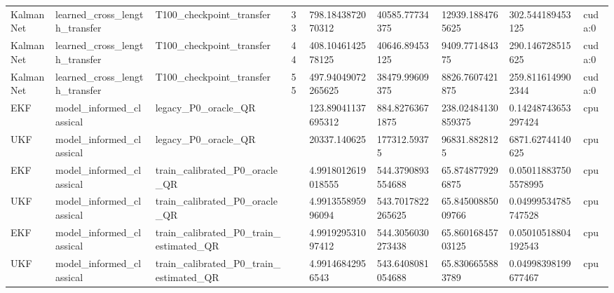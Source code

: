 \begin{table}[t]
\begin{tabular}{lllllllll}
KalmanNet & learned\_cross\_length\_transfer & T100\_checkpoint\_transfer & 33 & 798.1843872070312 & 40585.77734375 & 12939.1884765625 & 302.544189453125 & cuda:0 \\
KalmanNet & learned\_cross\_length\_transfer & T100\_checkpoint\_transfer & 44 & 408.1046142578125 & 40646.89453125 & 9409.771484375 & 290.146728515625 & cuda:0 \\
KalmanNet & learned\_cross\_length\_transfer & T100\_checkpoint\_transfer & 55 & 497.94049072265625 & 38479.99609375 & 8826.7607421875 & 259.8116149902344 & cuda:0 \\
EKF & model\_informed\_classical & legacy\_P0\_oracle\_QR &  & 123.89041137695312 & 884.82763671875 & 238.02484130859375 & 0.14248743653297424 & cpu \\
UKF & model\_informed\_classical & legacy\_P0\_oracle\_QR &  & 20337.140625 & 177312.59375 & 96831.8828125 & 6871.62744140625 & cpu \\
EKF & model\_informed\_classical & train\_calibrated\_P0\_oracle\_QR &  & 4.9918012619018555 & 544.3790893554688 & 65.8748779296875 & 0.050118837505578995 & cpu \\
UKF & model\_informed\_classical & train\_calibrated\_P0\_oracle\_QR &  & 4.991355895996094 & 543.7017822265625 & 65.84500885009766 & 0.04999534785747528 & cpu \\
EKF & model\_informed\_classical & train\_calibrated\_P0\_train\_estimated\_QR &  & 4.991929531097412 & 544.3056030273438 & 65.86016845703125 & 0.05010518804192543 & cpu \\
UKF & model\_informed\_classical & train\_calibrated\_P0\_train\_estimated\_QR &  & 4.99146842956543 & 543.6408081054688 & 65.8306655883789 & 0.04998398199677467 & cpu \\
\hline
\end{tabular}
\end{table}
